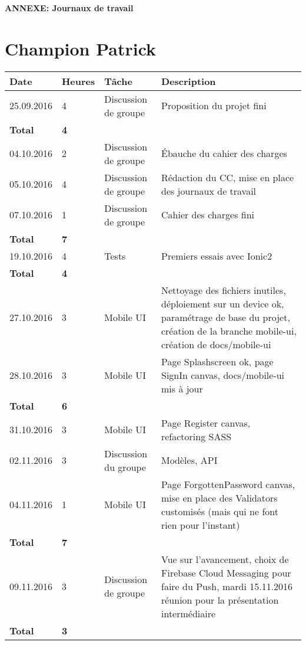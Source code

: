 \documentclass[french]{article}
\begin{document}
	\centering
	\large{\textbf{ANNEXE: Journaux de travail}}

	\justify

	\section*{Champion Patrick}
	\begin{longtable}{p{}|p{}|p{}|p{}}
		Date&Heures&Tâche&Description\\
		\hline \hline
		25.09.2016 & 4 & Discussion de groupe & Proposition du projet fini\\
		\textbf{Total} & \textbf{4} &&\\
		\hline
		04.10.2016 & 2 & Discussion de groupe & Ébauche du cahier des charges\\
		05.10.2016 & 4 & Discussion de groupe & Rédaction du CC, mise en place des journaux de travail\\
		07.10.2016 & 1 & Discussion de groupe & Cahier des charges fini\\
		\textbf{Total} & \textbf{7} &&\\
		\hline
		19.10.2016 & 4 & Tests & Premiers essais avec Ionic2\\
		\textbf{Total} & \textbf{4} &&\\
		\hline
		27.10.2016 & 3 & Mobile UI & Nettoyage des fichiers inutiles, déploiement sur un device ok, paramétrage de base du projet, création de la branche mobile-ui, création de docs/mobile-ui\\
		28.10.2016 & 3 & Mobile UI & Page Splashscreen ok, page SignIn canvas, docs/mobile-ui mis à jour\\
		\textbf{Total} & \textbf{6} &&\\
		\hline
		31.10.2016 & 3 & Mobile UI & Page Register canvas, refactoring SASS\\
		02.11.2016 & 3 & Discussion du groupe & Modèles, API\\
		04.11.2016 & 1 & Mobile UI & Page ForgottenPassword canvas, mise en place des Validators customisés (mais qui ne font rien pour l'instant)\\
		\textbf{Total} & \textbf{7} &&\\
		\hline
		09.11.2016 & 3 & Discussion de groupe & Vue sur l'avancement, choix de Firebase Cloud Messaging pour faire du Push, mardi 15.11.2016 réunion pour la présentation intermédiaire\\
		\textbf{Total} & \textbf{3} &&\\

\end{longtable}
\end{document}
